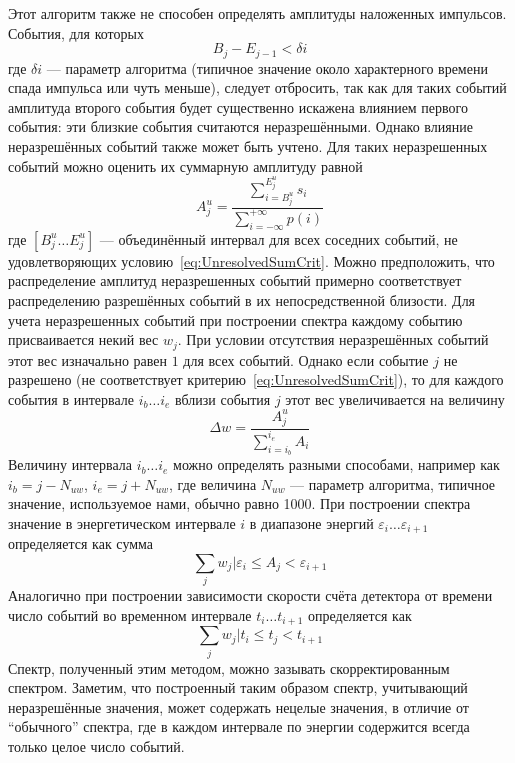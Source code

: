 Этот алгоритм также не способен определять амплитуды наложенных импульсов. События, для которых 
\begin{equation}
  \label{eq:UnresolvedSumCrit}
  B_j - E_{j-1} < \delta i 
\end{equation}
где $\delta i$ --- параметр алгоритма (типичное значение около характерного времени спада импульса или чуть меньше), следует отбросить, так как для таких событий амплитуда второго события будет существенно искажена влиянием первого события: эти близкие события считаются неразрешёнными. Однако влияние неразрешённых событий также может быть учтено. Для таких неразрешенных событий можно оценить их суммарную амплитуду равной
\begin{equation}
  \label{eq:UnresolvedAmplitude}
  A_j^u = \frac{  \sum \limits_{i = B^u_j}^{E^u_j} s_i }{ \sum \limits_{i = -\infty}^{+\infty} p(i) }
\end{equation}
где $\left[ B_j^u \ldots E_j^u \right] $ --- объединённый интервал для всех соседних событий, не удовлетворяющих условию~\ref{eq:UnresolvedSumCrit}. Можно предположить, что распределение амплитуд неразрешенных событий примерно соответствует распределению разрешённых событий в их непосредственной близости. Для учета неразрешенных событий при построении спектра каждому событию присваивается некий вес $w_j$. При условии отсутствия неразрешённых событий этот вес изначально равен $1$ для всех событий. Однако если событие $j$ не разрешено (не соответствует критерию~\ref{eq:UnresolvedSumCrit}), то для каждого события в интервале $i_b \ldots i_e$ вблизи события $j$ этот вес увеличивается на величину
\begin{equation*}
  \Delta w = \frac{ A_j^u }{ \sum \limits_{i=i_b}^{i_e} A_i } 
\end{equation*}
Величину интервала $i_b \ldots i_e$ можно определять разными способами, например как $i_b = j - N_{uw}$, $i_e = j + N_{uw}$, где величина $N_{uw}$ --- параметр алгоритма, типичное значение, используемое нами, обычно равно 1000. При построении спектра значение в энергетическом интервале $i$ в диапазоне энергий $\varepsilon_i \ldots \varepsilon_{i+1}$ определяется как сумма
\begin{equation*}
  \sum_j w_j | \varepsilon_i \le A_j < \varepsilon_{i+1}
\end{equation*}
Аналогично при построении зависимости скорости счёта детектора от времени число событий во временном интервале $t_i \ldots t_{i+1}$ определяется как
\begin{equation*}
  \sum_j w_j | t_i \le t_j < t_{i+1}
\end{equation*}
Спектр, полученный этим методом, можно зазывать скорректированным спектром. Заметим, что построенный таким образом спектр, учитывающий неразрешённые значения, может содержать нецелые значения, в отличие от ``обычного'' спектра, где в каждом интервале по энергии содержится всегда только целое число событий.~\cite{Khilkevitch2020}

